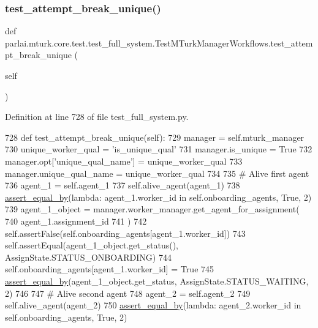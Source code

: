 \subsubsection{\texorpdfstring{test\+\_\+attempt\+\_\+break\+\_\+unique()}{test\_attempt\_break\_unique()}}
{\footnotesize\ttfamily def parlai.\+mturk.\+core.\+test.\+test\+\_\+full\+\_\+system.\+Test\+M\+Turk\+Manager\+Workflows.\+test\+\_\+attempt\+\_\+break\+\_\+unique (\begin{DoxyParamCaption}\item[{}]{self }\end{DoxyParamCaption})}



Definition at line 728 of file test\+\_\+full\+\_\+system.\+py.


\begin{DoxyCode}
728     \textcolor{keyword}{def }test\_attempt\_break\_unique(self):
729         manager = self.mturk\_manager
730         unique\_worker\_qual = \textcolor{stringliteral}{'is\_unique\_qual'}
731         manager.is\_unique = \textcolor{keyword}{True}
732         manager.opt[\textcolor{stringliteral}{'unique\_qual\_name'}] = unique\_worker\_qual
733         manager.unique\_qual\_name = unique\_worker\_qual
734 
735         \textcolor{comment}{# Alive first agent}
736         agent\_1 = self.agent\_1
737         self.alive\_agent(agent\_1)
738         \hyperlink{namespaceparlai_1_1mturk_1_1core_1_1test_1_1test__full__system_a0b463246d35658a2e422010f13dcf819}{assert\_equal\_by}(\textcolor{keyword}{lambda}: agent\_1.worker\_id \textcolor{keywordflow}{in} self.onboarding\_agents, \textcolor{keyword}{True}, 2)
739         agent\_1\_object = manager.worker\_manager.get\_agent\_for\_assignment(
740             agent\_1.assignment\_id
741         )
742         self.assertFalse(self.onboarding\_agents[agent\_1.worker\_id])
743         self.assertEqual(agent\_1\_object.get\_status(), AssignState.STATUS\_ONBOARDING)
744         self.onboarding\_agents[agent\_1.worker\_id] = \textcolor{keyword}{True}
745         \hyperlink{namespaceparlai_1_1mturk_1_1core_1_1test_1_1test__full__system_a0b463246d35658a2e422010f13dcf819}{assert\_equal\_by}(agent\_1\_object.get\_status, AssignState.STATUS\_WAITING, 2)
746 
747         \textcolor{comment}{# Alive second agent}
748         agent\_2 = self.agent\_2
749         self.alive\_agent(agent\_2)
750         \hyperlink{namespaceparlai_1_1mturk_1_1core_1_1test_1_1test__full__system_a0b463246d35658a2e422010f13dcf819}{assert\_equal\_by}(\textcolor{keyword}{lambda}: agent\_2.worker\_id \textcolor{keywordflow}{in} self.onboarding\_agents, \textcolor{keyword}{True}, 2)

\end{DoxyCode}
